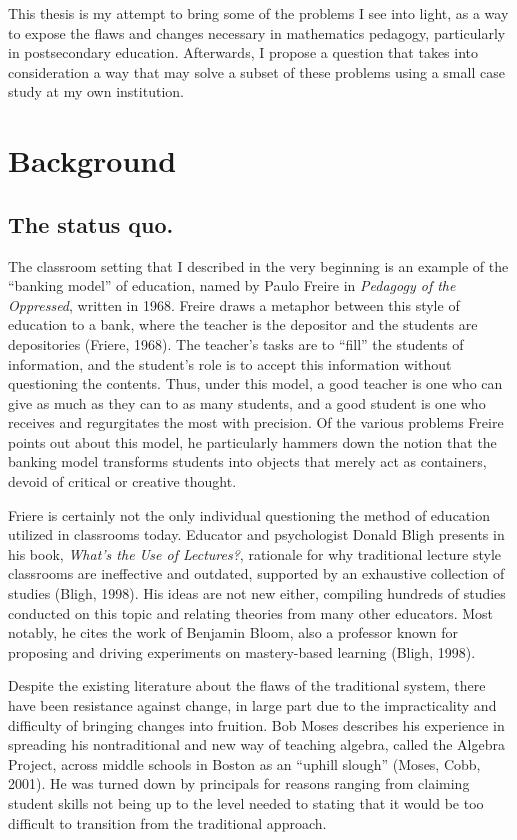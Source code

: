 This thesis is my attempt to bring some of the problems I see into light, as a way to expose the flaws and changes necessary in mathematics pedagogy, particularly in postsecondary education. Afterwards, I propose a question that takes into consideration a way that may solve a subset of these problems using a small case study at my own institution.

\section{Background}
\subsection{The status quo.}

The classroom setting that I described in the very beginning is an example of the ``banking model'' of education, named by Paulo Freire in {\it Pedagogy of the Oppressed}, written in 1968. Freire draws a metaphor between this style of education to a bank, where the teacher is the depositor and the students are depositories (Friere, 1968). The teacher's tasks are to ``fill'' the students of information, and the student's role is to accept this information without questioning the contents. Thus, under this model, a good teacher is one who can give as much as they can to as many students, and a good student is one who receives and regurgitates the most with precision. Of the various problems Freire points out about this model, he particularly hammers down the notion that the banking model transforms students into objects that merely act as containers, devoid of critical or creative thought.

Friere is certainly not the only individual questioning the method of education utilized in classrooms today. Educator and psychologist Donald Bligh presents in his book, {\it What's the Use of Lectures?}, rationale for why traditional lecture style classrooms are ineffective and outdated, supported by an exhaustive collection of studies (Bligh, 1998). His ideas are not new either, compiling hundreds of studies conducted on this topic and relating theories from many other educators. Most notably, he cites the work of Benjamin Bloom, also a professor known for proposing and driving experiments on mastery-based learning (Bligh, 1998).

Despite the existing literature about the flaws of the traditional system, there have been resistance against change, in large part due to the impracticality and difficulty of bringing changes into fruition. Bob Moses describes his experience in spreading his nontraditional and new way of teaching algebra, called the Algebra Project, across middle schools in Boston as an ``uphill slough'' (Moses, Cobb, 2001). He was turned down by principals for reasons ranging from claiming student skills not being up to the level needed to stating that it would be too difficult to transition from the traditional approach.

